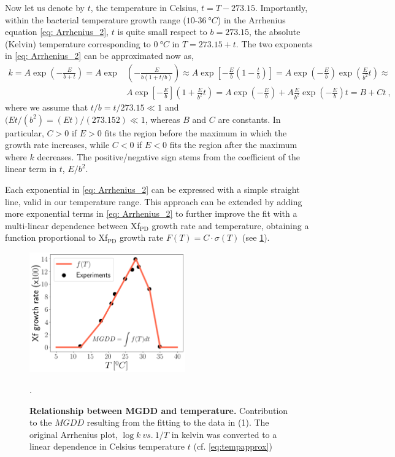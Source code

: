 Now let us denote by $t$, the temperature in Celsius, $t= T-273.15$.
Importantly, within the bacterial temperature growth range
($10$-$\SI{36}{\degree C}$) in the Arrhenius equation \cref{eq: Arrhenius_2},
$t$ is quite small respect to $b = 273.15$, the absolute (Kelvin) temperature
corresponding to $\SI{0}{\degree C}$ in $T = 273.15 + t$. The two exponents in
\cref{eq: Arrhenius_2} can be approximated now as,
\begin{equation}
    \begin{aligned}
        k=A \exp \left(-\frac{E}{b+t}\right)=A \exp & \left(-\frac{E}{b(1+t /
                b)}\right) \approx A \exp
        \left[-\frac{E}{b}\left(1-\frac{t}{b}\right)\right]=A
        \exp \left(-\frac{E}{b}\right) \exp \left(\frac{E}{b^{2}} t\right)
        \approx
        \\
                                                    & A \exp
        \left[-\frac{E}{b}\right]\left(1+\frac{E}{b^{2}} t\right)=A
        \exp \left(-\frac{E}{b}\right)+A \frac{E}{b^{2}} \exp
        \left(-\frac{E}{b}\right)
        t=B+C t \ ,
    \end{aligned}
    \label{eq:tempapprox}
\end{equation}
where we assume that $t/b = t/273.15 \ll1$ and	$(Et/(b^2) = (Et)/(273.152)
    \ll1$, whereas $B$ and $C$ are constants. In particular, $C>0$ if $E>0$
fits
the region before the maximum in which the growth rate increases, while $C<0$
if $E<0$ fits the region after the maximum where $k$ decreases. The
positive/negative sign stems from the coefficient of the linear term in $t$,
$E/b^2$.

Each exponential in \cref{eq: Arrhenius_2} can be expressed with a simple
straight line, valid in our temperature range. This approach can be extended by
adding more exponential terms in \cref{eq: Arrhenius_2} to further improve the
fit with a multi-linear dependence between Xf$_{\textrm{PD}}$ growth rate and
temperature, obtaining a function proportional to Xf$_{\textrm{PD}}$ growth
rate $F(T)=C\cdot\sigma(T)$ (see \cref{figS2}).

\begin{figure}[H]
    \centering
    \includegraphics[width=0.6\textwidth]{Figures/Climatic_layer_1.png}
    \caption{\textbf{Relationship between MGDD and temperature.}
        Contribution to the $MGDD$ resulting from the fitting to the data in
        (1). The
        original Arrhenius plot, $\log{k} \ vs. \ 1/T$ in kelvin was converted
        to
        a linear dependence in Celsius temperature $t$ (cf.
        \cref{eq:tempapprox})}.
    \label{figS2} %
\end{figure}

